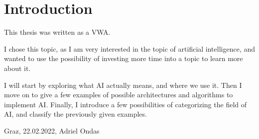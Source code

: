 \chapter{Introduction}
This thesis was written as a VWA.

I chose this topic, as I am very interested in the topic of artificial intelligence, and wanted to use the possibility of investing more time into a topic to learn more about it.

I will start by exploring what AI actually means, and where we use it. Then I move on to give a few examples of possible architectures and algorithms to implement AI. Finally, I introduce a few possibilities of categorizing the field of AI, and classify the previously given examples.

Graz, 22.02.2022, Adriel Ondas